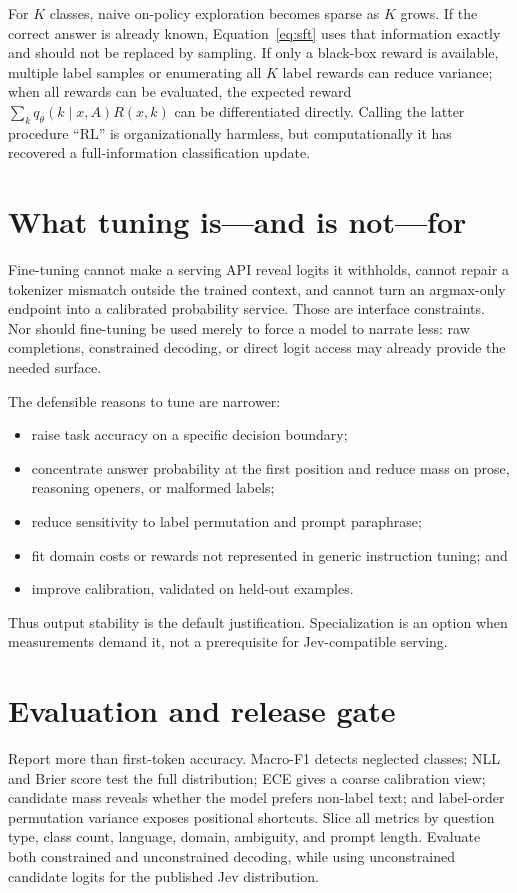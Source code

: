 \documentclass[11pt]{article}
\begin{document}
For $K$ classes, naive on-policy exploration becomes sparse as $K$ grows.
If the correct answer is already known, Equation~\ref{eq:sft} uses that
information exactly and should not be replaced by sampling.  If only a
black-box reward is available, multiple label samples or enumerating all
$K$ label rewards can reduce variance; when all rewards can be evaluated,
the expected reward $\sum_k q_\theta(k\mid x,A)R(x,k)$ can be differentiated
directly.  Calling the latter procedure ``RL'' is organizationally harmless,
but computationally it has recovered a full-information classification
update.

\section{What tuning is---and is not---for}

Fine-tuning cannot make a serving API reveal logits it withholds, cannot
repair a tokenizer mismatch outside the trained context, and cannot turn an
argmax-only endpoint into a calibrated probability service.  Those are
interface constraints.  Nor should fine-tuning be used merely to force a
model to narrate less: raw completions, constrained decoding, or direct
logit access may already provide the needed surface.

The defensible reasons to tune are narrower:
\begin{itemize}
\item raise task accuracy on a specific decision boundary;
\item concentrate answer probability at the first position and reduce mass
on prose, reasoning openers, or malformed labels;
\item reduce sensitivity to label permutation and prompt paraphrase;
\item fit domain costs or rewards not represented in generic instruction
tuning; and
\item improve calibration, validated on held-out examples.
\end{itemize}
Thus output stability is the default justification.  Specialization is an
option when measurements demand it, not a prerequisite for Jev-compatible
serving.

\section{Evaluation and release gate}

Report more than first-token accuracy.  Macro-F1 detects neglected classes;
NLL and Brier score test the full distribution; ECE gives a coarse calibration
view; candidate mass reveals whether the model prefers non-label text; and
label-order permutation variance exposes positional shortcuts.  Slice all
metrics by question type, class count, language, domain, ambiguity, and
prompt length.  Evaluate both constrained and unconstrained decoding, while
using unconstrained candidate logits for the published Jev distribution.
\end{document}
